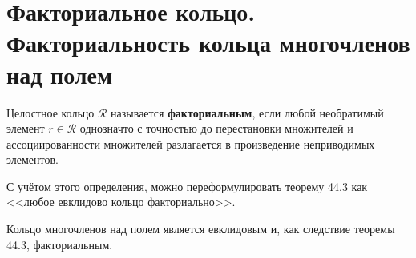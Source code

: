 \section{Факториальное кольцо. Факториальность кольца многочленов над полем}

\begin{definition}
    Целостное кольцо $\mathcal{R}$ называется \textbf{факториальным}, если любой необратимый элемент $r \in \mathcal{R}$ однозначто с точностью до перестановки множителей и ассоциированности множителей разлагается в произведение неприводимых элементов.
\end{definition}

\begin{remark}
    С учётом этого определения, можно переформулировать теорему 44.3 как <<любое евклидово кольцо факториально>>.
\end{remark}

Кольцо многочленов над полем является евклидовым и, как следствие теоремы 44.3, факториальным.


